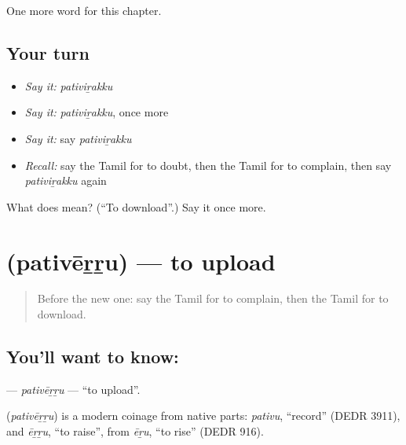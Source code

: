 \begin{grammarlens}[title={What you've built}]
One more word for this chapter.
\end{grammarlens}

\subsection*{Your turn}
\begin{itemize}
\raggedright
  \item \emph{Say it:} \emph{pativiṟakku}
  \item \emph{Say it:} \emph{pativiṟakku}, once more
  \item \emph{Say it:} say \emph{pativiṟakku}
  \item \emph{Recall:} say the Tamil for to doubt, then the Tamil for to complain, then say \emph{pativiṟakku} again
\end{itemize}

\begin{tcolorbox}[breakable,colback=teal!4,colframe=teal!35!black,title={Before you move on}]
What does  mean? (\textquotedblleft{}To download\textquotedblright{}.) Say it once more.
\end{tcolorbox}
\section[\texorpdfstring{\ta{பதிவேற்று} (pativēṟṟu)}{பதிவேற்று (pativēṟṟu)}]{ (pativēṟṟu) — to upload}

\label{lesson:TA-C230-pativerru}



\begin{quote}
Before the new one: say the Tamil for to complain, then the Tamil for to download.
\end{quote}

\subsection*{You'll want to know: }
\textbf{} — \emph{pativēṟṟu} — \textquotedblleft{}to upload\textquotedblright{}.

\begin{cousinweb}
\textbf{} (\emph{pativēṟṟu}) is a modern coinage from native parts: \emph{pativu}, \textquotedblleft{}record\textquotedblright{} (DEDR 3911), and \emph{ēṟṟu}, \textquotedblleft{}to raise\textquotedblright{}, from \emph{ēṟu}, \textquotedblleft{}to rise\textquotedblright{} (DEDR 916).
\end{cousinweb}

